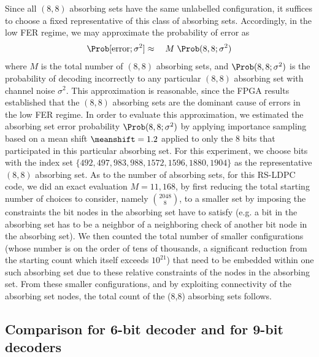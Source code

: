 Since all $(8,8)$ absorbing sets have the same unlabelled
configuration, it suffices to choose a fixed representative of this
class of absorbing sets.  Accordingly, in the low FER regime, we may
approximate the probability of error as
\begin{eqnarray}
\label{EqnApprox}
\Prob[\mbox{error}; \sigma^2] & \approx & \; M \; \Prob(8,8; \sigma^2)
\end{eqnarray}
where $M$ is the total number of $(8,8)$ absorbing sets, and
$\Prob(8,8; \sigma^2)$ is the probability of decoding incorrectly
to any particular $(8,8)$ absorbing set with channel noise
$\sigma^2$. This approximation is reasonable, since the FPGA
results established that the $(8,8)$ absorbing sets are the
dominant cause of errors in the low FER regime.  In order to
evaluate this approximation, we estimated the absorbing set error
probability $\Prob(8,8; \sigma^2)$ by applying importance sampling
based on a mean shift $\meanshift = 1.2$ applied to only the $8$
bits that participated in this particular absorbing set.  For this
experiment, we choose bits with the index set $\{492, 497, 983,
988, 1572, 1596, 1880, 1904\}$ as the representative $(8,8)$
absorbing set.  As to the number of absorbing sets, for this
RS-LDPC code, we did an exact evaluation $M = 11,168$, by first
reducing the total starting number of choices to consider, namely
${2048 \choose 8}$, to a smaller set by imposing the constraints
the bit nodes in the absorbing set have to satisfy (e.g. a bit in
the absorbing set has to be a neighbor of a neighboring check of
another bit node in the absorbing set). We then counted the total
number of smaller configurations (whose number is on the order of
tens of thousands, a significant reduction from the starting count
which itself exceeds $10^{21}$) that need to be embedded within
one such absorbing set due to these relative constraints of the
nodes in the absorbing set. From these smaller configurations, and
by exploiting connectivity of the absorbing set nodes, the total
count of the (8,8) absorbing sets follows.





\subsection{Comparison for 6-bit decoder and for 9-bit decoders}


